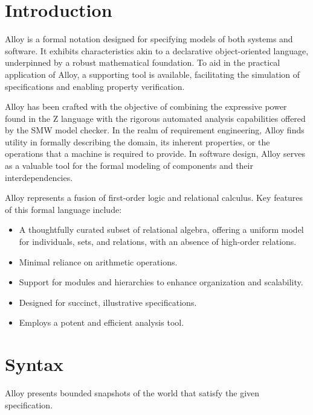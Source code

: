 \documentclass[12pt, a4paper]{report}
\begin{document}
    \section{Introduction}
    Alloy is a formal notation designed for specifying models of both systems and software. 
    It exhibits characteristics akin to a declarative object-oriented language, underpinned by a robust mathematical foundation.   
    To aid in the practical application of Alloy, a supporting tool is available, facilitating the simulation of specifications and enabling property verification.
    
    Alloy has been crafted with the objective of combining the expressive power found in the Z language with the rigorous automated analysis capabilities offered by the SMW model checker.
    In the realm of requirement engineering, Alloy finds utility in formally describing the domain, its inherent properties, or the operations that a machine is required to provide.
    In software design, Alloy serves as a valuable tool for the formal modeling of components and their interdependencies.    

    Alloy represents a fusion of first-order logic and relational calculus. 
    Key features of this formal language include:
    \begin{itemize}
        \item A thoughtfully curated subset of relational algebra, offering a uniform model for individuals, sets, and relations, with an absence of high-order relations.
        \item Minimal reliance on arithmetic operations.
        \item Support for modules and hierarchies to enhance organization and scalability.
        \item Designed for succinct, illustrative specifications.
        \item Employs a potent and efficient analysis tool.
    \end{itemize}
    
    \section{Syntax}
    Alloy presents bounded snapshots of the world that satisfy the given specification. 
    
\end{document}
